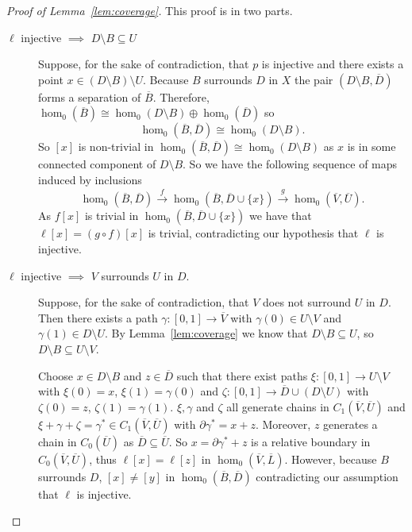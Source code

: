 
\begin{proof}[Proof of Lemma~\ref{lem:coverage}]
  This proof is in two parts.
  \begin{description}
    \item[$\ell$ injective $\implies$ $D\setminus B\subseteq U$] Suppose, for the sake of contradiction, that $p$ is injective and there exists a point $x\in (D\setminus B)\setminus U$.
      Because $B$ surrounds $D$ in $X$ the pair $(D\setminus B, \overline{D})$ forms a separation of $\overline{B}$.
      Therefore, $\hom_0(\overline{B})\cong \hom_0(D\setminus B)\oplus \hom_0(\overline{D})$ so
      \[ \hom_0(\overline{B}, \overline{D})\cong \hom_0(D\setminus B). \]
      So $[x]$ is non-trivial in $\hom_0(\overline{B},\overline{D})\cong \hom_0(D\setminus B)$ as $x$ is in some connected component of $D\setminus B$.
      So we have the following sequence of maps induced by inclusions
      \[ \hom_0(\overline{B},\overline{D})\xrightarrow{f} \hom_0(\overline{B},\overline{D}\cup\{x\})\xrightarrow{g} \hom_0(\overline{V},\overline{U}).\]
      As $f[x]$ is trivial in $\hom_0(\overline{B},\overline{D}\cup\{x\})$ we have that $\ell[x] = (g\circ f)[x]$ is trivial, contradicting our hypothesis that $\ell$ is injective.
    \item[$\ell$ injective $\implies$ $V$ surrounds $U$ in $D$.] Suppose, for the sake of contradiction, that $V$ does not surround $U$ in $D$.
      Then there exists a path $\gamma : [0,1]\to\overline{V}$ with $\gamma(0)\in U\setminus V$ and $\gamma(1)\in D\setminus U$.
      By Lemma~\ref{lem:coverage} we know that $D\setminus B\subseteq U$, so $D\setminus B\subseteq U\setminus V$.

      Choose $x\in D\setminus B$ and $z\in \overline{D}$ such that there exist paths $\xi : [0,1]\to U\setminus V$ with $\xi(0) = x$, $\xi(1) = \gamma(0)$ and $\zeta : [0,1]\to \overline{D}\cup (D\setminus U)$ with $\zeta(0) = z$, $\zeta(1) = \gamma(1)$.
      $\xi, \gamma$ and $\zeta$ all generate chains in $C_1(\overline{V}, \overline{U})$ and $\xi + \gamma + \zeta = \gamma^*\in C_1(\overline{V}, \overline{U})$ with $\partial\gamma^* = x + z$.
      Moreover, $z$ generates a chain in $C_0(\overline{U})$ as $\overline{D}\subseteq\overline{U}$.
      So $x = \partial\gamma^* + z$ is a relative boundary in $C_0(\overline{V}, \overline{U})$, thus $\ell[x] = \ell[z]$ in $\hom_0(\overline{V}, \overline{L})$.
      However, because $B$ surrounds $D$, $[x]\neq [y]$ in $\hom_0(\overline{B}, \overline{D})$ contradicting our assumption that $\ell$ is injective.
    \end{description}
\end{proof}

